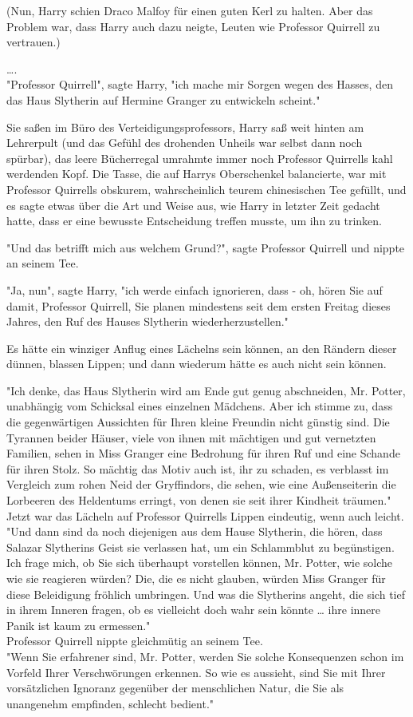 {(Nun, Harry schien Draco Malfoy für einen guten Kerl zu halten. Aber das Problem war, dass Harry auch dazu neigte, Leuten wie Professor Quirrell zu vertrauen.)

….\\ "Professor Quirrell", sagte Harry, "ich mache mir Sorgen wegen des Hasses, den das Haus Slytherin auf Hermine Granger zu entwickeln scheint."

Sie saßen im Büro des Verteidigungsprofessors, Harry saß weit hinten am Lehrerpult (und das Gefühl des drohenden Unheils war selbst dann noch spürbar), das leere Bücherregal umrahmte immer noch Professor Quirrells kahl werdenden Kopf. Die Tasse, die auf Harrys Oberschenkel balancierte, war mit Professor Quirrells obskurem, wahrscheinlich teurem chinesischen Tee gefüllt, und es sagte etwas über die Art und Weise aus, wie Harry in letzter Zeit gedacht hatte, dass er eine bewusste Entscheidung treffen musste, um ihn zu trinken.

"Und das betrifft mich aus welchem Grund?", sagte Professor Quirrell und nippte an seinem Tee.

"Ja, nun", sagte Harry, "ich werde einfach ignorieren, dass - oh, hören Sie auf damit, Professor Quirrell, Sie planen mindestens seit dem ersten Freitag dieses Jahres, den Ruf des Hauses Slytherin wiederherzustellen."

Es hätte ein winziger Anflug eines Lächelns sein können, an den Rändern dieser dünnen, blassen Lippen; und dann wiederum hätte es auch nicht sein können.

"Ich denke, das Haus Slytherin wird am Ende gut genug abschneiden, Mr. Potter, unabhängig vom Schicksal eines einzelnen Mädchens. Aber ich stimme zu, dass die gegenwärtigen Aussichten für Ihren kleine Freundin nicht günstig sind. Die Tyrannen beider Häuser, viele von ihnen mit mächtigen und gut vernetzten Familien, sehen in Miss Granger eine Bedrohung für ihren Ruf und eine Schande für ihren Stolz. So mächtig das Motiv auch ist, ihr zu schaden, es verblasst im Vergleich zum rohen Neid der Gryffindors, die sehen, wie eine Außenseiterin die Lorbeeren des Heldentums erringt, von denen sie seit ihrer Kindheit träumen."\\ Jetzt war das Lächeln auf Professor Quirrells Lippen eindeutig, wenn auch leicht. "Und dann sind da noch diejenigen aus dem Hause Slytherin, die hören, dass Salazar Slytherins Geist sie verlassen hat, um ein Schlammblut zu begünstigen. Ich frage mich, ob Sie sich überhaupt vorstellen können, Mr. Potter, wie solche wie sie reagieren würden? Die, die es nicht glauben, würden Miss Granger für diese Beleidigung fröhlich umbringen. Und was die Slytherins angeht, die sich tief in ihrem Inneren fragen, ob es vielleicht doch wahr sein könnte … ihre innere Panik ist kaum zu ermessen."\\ Professor Quirrell nippte gleichmütig an seinem Tee.\\ "Wenn Sie erfahrener sind, Mr. Potter, werden Sie solche Konsequenzen schon im Vorfeld Ihrer Verschwörungen erkennen. So wie es aussieht, sind Sie mit Ihrer vorsätzlichen Ignoranz gegenüber der menschlichen Natur, die Sie als unangenehm empfinden, schlecht bedient."

}
